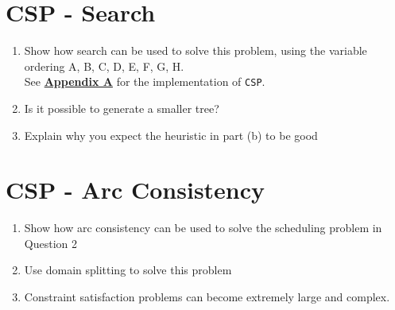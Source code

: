 \documentclass{article}
\def\ans#1{{\color{ans}#1}}
\begin{document}
\clearpage
\section{CSP - Search}
\begin{enumerate}[label=(\alph*)]
    \item Show how search can be used to solve this problem, using the variable ordering A, B, C, D, E, F, G, H. \\
    \ans{
        See \hyperref[appendix:CSP Search]{\textbf{Appendix A}} for the implementation of \texttt{CSP}.\\
    }
    \item Is it  possible  to  generate a  smaller  tree? 
    \ans{
    }
    \item Explain why you expect the heuristic in part (b) to be good
    \ans{
    }
\end{enumerate}

\clearpage
\section{CSP - Arc Consistency}
\begin{enumerate}[label=(\alph*)]
    \item Show how arc consistency can be used to solve the scheduling problem in Question 2
    \ans{
    }
    \item Use domain splitting to solve this problem
    \ans{
    }
    \item Constraint satisfaction problems can become extremely large and complex.
    \ans{
    }
\end{enumerate}

\clearpage
\end{document}
